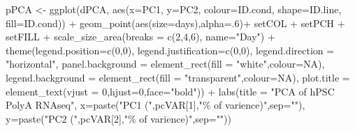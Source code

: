 \documentclass[]{article}
\newcommand{\hlnum}[1]{\textcolor[rgb]{0.816,0.125,0.439}{#1}}%
\newcommand{\hlstr}[1]{\textcolor[rgb]{0.251,0.627,0.251}{#1}}%
\newcommand{\hlstd}[1]{\textcolor[rgb]{0.251,0.251,0.251}{#1}}%
\newenvironment{Shaded}{\begin{myshaded}}{\end{myshaded}}
\newcommand{\DecValTok}[1]{\hlnum{#1}}
\newcommand{\ConstantTok}[1]{\hlnum{#1}}
\newcommand{\SpecialCharTok}[1]{\hlstr{#1}}
\newcommand{\StringTok}[1]{\hlstr{#1}}
\newcommand{\OtherTok}[1]{{#1}}
\newcommand{\FunctionTok}[1]{\hlstd{#1}}
\newcommand{\AttributeTok}[1]{{#1}}
\newcommand{\NormalTok}[1]{\hlstd{#1}}
\begin{document}
\begin{Shaded}
\begin{Highlighting}[]
\NormalTok{pPCA }\OtherTok{\textless{}{-}} \FunctionTok{ggplot}\NormalTok{(dPCA, }\FunctionTok{aes}\NormalTok{(}\AttributeTok{x=}\NormalTok{PC1, }\AttributeTok{y=}\NormalTok{PC2, }\AttributeTok{colour=}\NormalTok{ID.cond, }\AttributeTok{shape=}\NormalTok{ID.line,}
        \AttributeTok{fill=}\NormalTok{ID.cond)) }\SpecialCharTok{+}
        \FunctionTok{geom\_point}\NormalTok{(}\FunctionTok{aes}\NormalTok{(}\AttributeTok{size=}\NormalTok{days),}\AttributeTok{alpha=}\NormalTok{.}\DecValTok{6}\NormalTok{)}\SpecialCharTok{+}
\NormalTok{        setCOL }\SpecialCharTok{+}\NormalTok{ setPCH  }\SpecialCharTok{+}\NormalTok{ setFILL }\SpecialCharTok{+}
        \FunctionTok{scale\_size\_area}\NormalTok{(}\AttributeTok{breaks =} \FunctionTok{c}\NormalTok{(}\DecValTok{2}\NormalTok{,}\DecValTok{4}\NormalTok{,}\DecValTok{6}\NormalTok{), }\AttributeTok{name=}\StringTok{"Day"}\NormalTok{) }\SpecialCharTok{+}
        \FunctionTok{theme}\NormalTok{(}\AttributeTok{legend.position=}\FunctionTok{c}\NormalTok{(}\DecValTok{0}\NormalTok{,}\DecValTok{0}\NormalTok{), }\AttributeTok{legend.justification=}\FunctionTok{c}\NormalTok{(}\DecValTok{0}\NormalTok{,}\DecValTok{0}\NormalTok{),}
              \AttributeTok{legend.direction =} \StringTok{"horizontal"}\NormalTok{,}
              \AttributeTok{panel.background =} \FunctionTok{element\_rect}\NormalTok{(}\AttributeTok{fill =} \StringTok{"white"}\NormalTok{,}\AttributeTok{colour=}\ConstantTok{NA}\NormalTok{),}
              \AttributeTok{legend.background =} \FunctionTok{element\_rect}\NormalTok{(}\AttributeTok{fill =} \StringTok{"transparent"}\NormalTok{,}\AttributeTok{colour=}\ConstantTok{NA}\NormalTok{),}
              \AttributeTok{plot.title =} \FunctionTok{element\_text}\NormalTok{(}\AttributeTok{vjust =} \DecValTok{0}\NormalTok{,}\AttributeTok{hjust=}\DecValTok{0}\NormalTok{,}\AttributeTok{face=}\StringTok{"bold"}\NormalTok{)) }\SpecialCharTok{+}
        \FunctionTok{labs}\NormalTok{(}\AttributeTok{title =} \StringTok{"PCA of hPSC PolyA RNAseq"}\NormalTok{,}
            \AttributeTok{x=}\FunctionTok{paste}\NormalTok{(}\StringTok{"PC1 ("}\NormalTok{,pcVAR[}\DecValTok{1}\NormalTok{],}\StringTok{"\% of varience)"}\NormalTok{,}\AttributeTok{sep=}\StringTok{""}\NormalTok{),}
            \AttributeTok{y=}\FunctionTok{paste}\NormalTok{(}\StringTok{"PC2 ("}\NormalTok{,pcVAR[}\DecValTok{2}\NormalTok{],}\StringTok{"\% of varience)"}\NormalTok{,}\AttributeTok{sep=}\StringTok{""}\NormalTok{))}
\end{Highlighting}
\end{Shaded}
\end{document}
